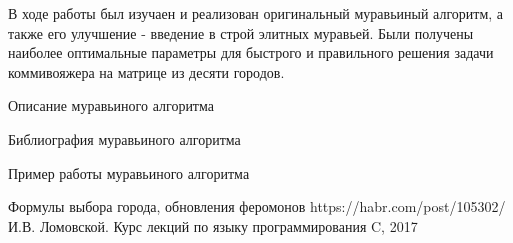 \documentclass[a4paper, 14pt]{article}
\begin{document}
	\hspace{1cm}В ходе работы был изучаен и реализован оригинальный муравьиный алгоритм, а также его улучшение - введение в строй элитных муравьей. Были получены наиболее оптимальные параметры для быстрого и правильного решения задачи коммивояжера на матрице из десяти городов.
    
    \newpage

    \begin{thebibliography}{11} 
    
     Описание муравьиного алгоритма 
    
     Библиография муравьиного алгоритма
    
     Пример работы муравьиного алгоритма
    
     Формулы выбора города, обновления феромонов https://habr.com/post/105302/
    И.В. Ломовской. Курс лекций по языку программирования C, 2017
    
    \end{thebibliography}
\end{document}
